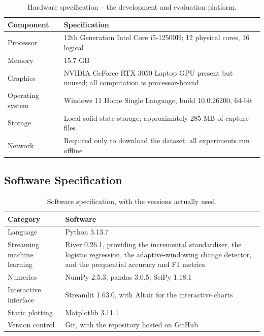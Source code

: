 \documentclass[12pt,a4paper]{report}
\begin{document}
\begin{table}[htbp]
\centering
\caption{Hardware specification -- the development and evaluation platform.}
\label{tab:hw}
\small
\begin{tabular}{@{}p{3.5cm}p{9.6cm}@{}}
\toprule
\textbf{Component} & \textbf{Specification}\\
\midrule
Processor & 12th Generation Intel Core i5-12500H; 12 physical cores, 16 logical\\
Memory & 15.7 GB\\
Graphics & NVIDIA GeForce RTX 3050 Laptop GPU present but unused; all
computation is processor-bound\\
Operating system & Windows 11 Home Single Language, build 10.0.26200, 64-bit\\
Storage & Local solid-state storage; approximately 285 MB of capture files\\
Network & Required only to download the dataset; all experiments run offline\\
\bottomrule
\end{tabular}
\end{table}

\subsection{Software Specification}

\begin{table}[htbp]
\centering
\caption{Software specification, with the versions actually used.}
\label{tab:sw}
\small
\begin{tabular}{@{}p{3.5cm}p{9.6cm}@{}}
\toprule
\textbf{Category} & \textbf{Software}\\
\midrule
Language & Python 3.13.7\\
Streaming machine learning & River 0.26.1, providing the incremental
standardiser, the logistic regression, the adaptive-windowing change detector,
and the prequential accuracy and F1 metrics\\
Numerics & NumPy 2.5.3; pandas 3.0.5; SciPy 1.18.1\\
Interactive interface & Streamlit 1.63.0, with Altair for the interactive
charts\\
Static plotting & Matplotlib 3.11.1\\
Version control & Git, with the repository hosted on GitHub\\
\bottomrule
\end{tabular}
\end{table}
\end{document}

